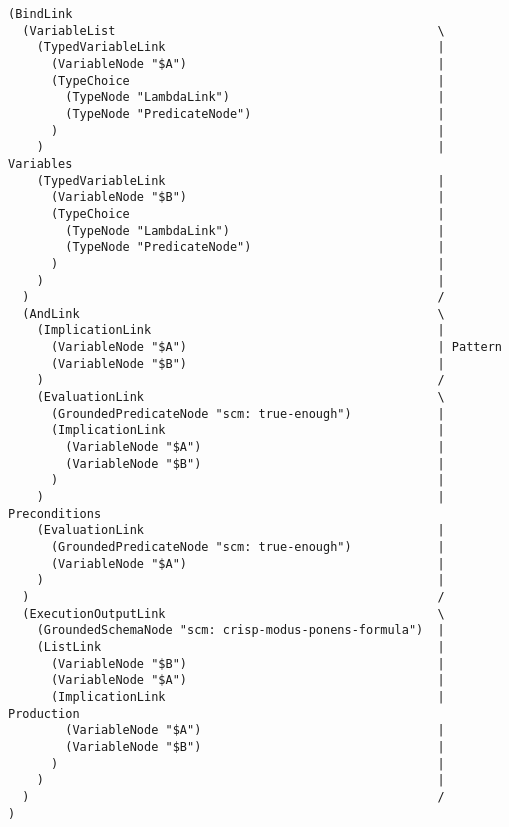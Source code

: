 \documentclass{beamer}
\begin{document}
\begin{frame}[fragile]
  {\Tiny
\begin{verbatim}
(BindLink
  (VariableList                                             \
    (TypedVariableLink                                      |
      (VariableNode "$A")                                   |
      (TypeChoice                                           |
        (TypeNode "LambdaLink")                             |
        (TypeNode "PredicateNode")                          |
      )                                                     |
    )                                                       | Variables
    (TypedVariableLink                                      |
      (VariableNode "$B")                                   |
      (TypeChoice                                           |
        (TypeNode "LambdaLink")                             |
        (TypeNode "PredicateNode")                          |
      )                                                     |
    )                                                       |
  )                                                         /
  (AndLink                                                  \
    (ImplicationLink                                        |
      (VariableNode "$A")                                   | Pattern
      (VariableNode "$B")                                   |
    )                                                       /
    (EvaluationLink                                         \
      (GroundedPredicateNode "scm: true-enough")            |
      (ImplicationLink                                      |
        (VariableNode "$A")                                 |
        (VariableNode "$B")                                 |
      )                                                     |
    )                                                       | Preconditions
    (EvaluationLink                                         |
      (GroundedPredicateNode "scm: true-enough")            |
      (VariableNode "$A")                                   |
    )                                                       |
  )                                                         /
  (ExecutionOutputLink                                      \
    (GroundedSchemaNode "scm: crisp-modus-ponens-formula")  |
    (ListLink                                               |
      (VariableNode "$B")                                   |
      (VariableNode "$A")                                   |
      (ImplicationLink                                      | Production
        (VariableNode "$A")                                 |
        (VariableNode "$B")                                 |
      )                                                     |
    )                                                       |
  )                                                         /
)
\end{verbatim}
}

\end{frame}
\end{document}
